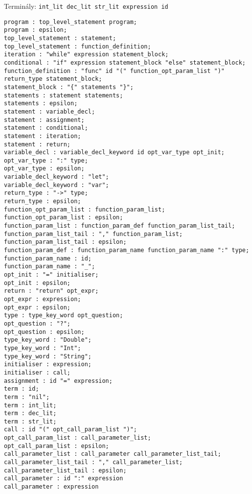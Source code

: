 Terminály: \lstinline{int_lit dec_lit str_lit expression id}

\begin{lstlisting}
program : top_level_statement program;
program : epsilon;
top_level_statement : statement;
top_level_statement : function_definition;
iteration : "while" expression statement_block;
conditional : "if" expression statement_block "else" statement_block;
function_definition : "func" id "(" function_opt_param_list ")" return_type statement_block;
statement_block : "{" statements "}";
statements : statement statements;
statements : epsilon;
statement : variable_decl;
statement : assignment;
statement : conditional;
statement : iteration;
statement : return;
variable_decl : variable_decl_keyword id opt_var_type opt_init;
opt_var_type : ":" type;
opt_var_type : epsilon;
variable_decl_keyword : "let";
variable_decl_keyword : "var";
return_type : "->" type;
return_type : epsilon;
function_opt_param_list : function_param_list;
function_opt_param_list : epsilon;
function_param_list : function_param_def function_param_list_tail;
function_param_list_tail : "," function_param_list;
function_param_list_tail : epsilon;
function_param_def : function_param_name function_param_name ":" type;
function_param_name : id;
function_param_name : "_";
opt_init : "=" initialiser;
opt_init : epsilon;
return : "return" opt_expr;
opt_expr : expression;
opt_expr : epsilon;
type : type_key_word opt_question;
opt_question : "?";
opt_question : epsilon;
type_key_word : "Double";
type_key_word : "Int";
type_key_word : "String";
initialiser : expression;
initialiser : call;
assignment : id "=" expression;
term : id;
term : "nil";
term : int_lit;
term : dec_lit;
term : str_lit;
call : id "(" opt_call_param_list ")";
opt_call_param_list : call_parameter_list;
opt_call_param_list : epsilon;
call_parameter_list : call_parameter call_parameter_list_tail;
call_parameter_list_tail : "," call_parameter_list;
call_parameter_list_tail : epsilon;
call_parameter : id ":" expression
call_parameter : expression
\end{lstlisting}
